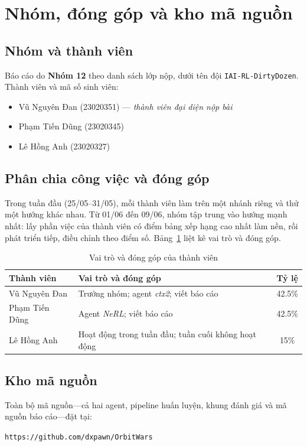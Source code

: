 \documentclass[conference]{IEEEtran}
\begin{document}
\section{Nhóm, đóng góp và kho mã nguồn}
\label{sec:team}

\subsection{Nhóm và thành viên}
Báo cáo do \textbf{Nhóm 12} theo danh sách lớp nộp, dưới tên đội \texttt{IAI-RL-DirtyDozen}. Thành viên và mã số sinh viên:
\begin{itemize}
\item Vũ Nguyên Đan (23020351) --- \emph{thành viên đại diện nộp bài}
\item Phạm Tiến Dũng (23020345)
\item Lê Hồng Anh (23020327)
\end{itemize}

\subsection{Phân chia công việc và đóng góp}
Trong tuần đầu (25/05--31/05), mỗi thành viên làm trên một nhánh riêng và thử một hướng khác nhau. Từ 01/06 đến 09/06, nhóm tập trung vào hướng mạnh nhất: lấy phần việc của thành viên có điểm bảng xếp hạng cao nhất làm nền, rồi phát triển tiếp, điều chỉnh theo điểm số. Bảng~\ref{tab:contrib} liệt kê vai trò và đóng góp.

\begin{table}[htbp]
\caption{Vai trò và đóng góp của thành viên}
\label{tab:contrib}
\centering
\small
\begin{tabular}{lp{4.4cm}c}
\toprule
\textbf{Thành viên} & \textbf{Vai trò và đóng góp} & \textbf{Tỷ lệ} \\
\midrule
Vũ Nguyên Đan & Trưởng nhóm; agent \textit{ctx2}; viết báo cáo & 42.5\% \\
Phạm Tiến Dũng & Agent \textit{NeRL}; viết báo cáo & 42.5\% \\
Lê Hồng Anh & Hoạt động trong tuần đầu; tuần cuối không hoạt động & 15\% \\
\bottomrule
\end{tabular}
\end{table}

\subsection{Kho mã nguồn}
Toàn bộ mã nguồn---cả hai agent, pipeline huấn luyện, khung đánh giá và mã nguồn báo cáo---đặt tại:
\begin{center}
\texttt{https://github.com/dxpawn/OrbitWars}
\end{center}
\end{document}

